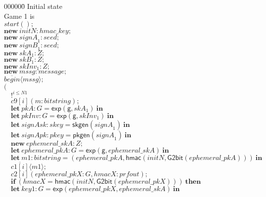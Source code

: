 \documentclass{article}
\newcommand{\cinput}[2]{{#1}({#2})}
\newcommand{\coutput}[2]{\overline{#1}\langle{#2}\rangle}
\newcommand{\kw}[1]{\mathbf{#1}}
\newcommand{\kwf}[1]{\mathsf{#1}}
\newcommand{\var}[1]{\mathit{#1}}
\newcommand{\kwt}[1]{\mathit{#1}}
\newcommand{\kwp}[1]{\mathit{#1}}
\newcommand{\kwc}[1]{\mathit{#1}}
\begin{document}
\begin{tabbing}
000000\=\kill
Initial state\\
Game 1 is\\
\>$\cinput{\kwc{start}}{};$\\
\>$\kw{new}\ \var{initN}: \kwt{hmac{\_}key};$\\
\>$\kw{new}\ \var{signA}_{1}: \kwt{seed};$\\
\>$\kw{new}\ \var{signB}_{1}: \kwt{seed};$\\
\>$\kw{new}\ \var{skA}_{1}: \kwt{Z};$\\
\>$\kw{new}\ \var{skB}_{1}: \kwt{Z};$\\
\>$\kw{new}\ \var{skInv}_{1}: \kwt{Z};$\\
\>$\kw{new}\ \var{mssg}: \kwt{message};$\\
\>$\coutput{\kwc{begin}}{\var{mssg}};$\\
\>$($\\
\>$\quad !^{\var{i} \leq \kwp{N1}}$\\
\>$\quad \cinput{\kwc{c9}[\var{i}]}{\var{m}: \kwt{bitstring}};$\\
\>$\quad \kw{let}\ \var{pkA}: \kwt{G} = \kwf{exp}(\kwf{g}, \var{skA}_{1})\ \kw{in}$\\
\>$\quad \kw{let}\ \var{pkInv}: \kwt{G} = \kwf{exp}(\kwf{g}, \var{skInv}_{1})\ \kw{in}$\\
\>$\quad \kw{let}\ \var{signAsk}: \kwt{skey} = \kwf{skgen}(\var{signA}_{1})\ \kw{in}$\\
\>$\quad \kw{let}\ \var{signApk}: \kwt{pkey} = \kwf{pkgen}(\var{signA}_{1})\ \kw{in}$\\
\>$\quad \kw{new}\ \var{ephemeral{\_}skA}: \kwt{Z};$\\
\>$\quad \kw{let}\ \var{ephemeral{\_}pkA}: \kwt{G} = \kwf{exp}(\kwf{g}, \var{ephemeral{\_}skA})\ \kw{in}$\\
\>$\quad \kw{let}\ \var{m1}: \kwt{bitstring} = \kwf{}(\var{ephemeral{\_}pkA}, \kwf{hmac}(\var{initN}, \kwf{G2bit}(\var{ephemeral{\_}pkA})))\ \kw{in}$\\
\>$\quad \coutput{\kwc{c1}[\var{i}]}{\var{m1}};$\\
\>$\quad \cinput{\kwc{c2}[\var{i}]}{\var{ephemeral{\_}pkX}: \kwt{G}, \var{hmacX}: \kwt{prfout}};$\\
\>$\quad \kw{if}\ (\var{hmacX}  =  \kwf{hmac}(\var{initN}, \kwf{G2bit}(\var{ephemeral{\_}pkX})))\ \kw{then}$\\
\>$\quad \kw{let}\ \var{key1}: \kwt{G} = \kwf{exp}(\var{ephemeral{\_}pkX}, \var{ephemeral{\_}skA})\ \kw{in}$\\

\end{tabbing}
\end{document}
